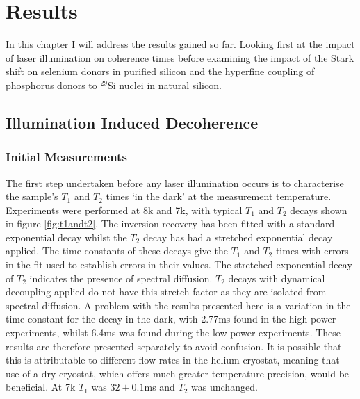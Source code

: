 \chapter{Results}

In this chapter I will address the results gained so far. Looking first at the impact of laser illumination on coherence times before examining the impact of the Stark shift on selenium donors in purified silicon and the hyperfine coupling of phosphorus donors to $^{29}$Si nuclei in natural silicon.

\section{Illumination Induced Decoherence}

\subsection{Initial Measurements}

The first step undertaken before any laser illumination occurs is to characterise the sample's $T_1$ and $T_2$ times `in the dark' at the measurement temperature. 
Experiments were performed at 8k and 7k, with typical $T_1$ and $T_2$ decays shown in figure \ref{fig:t1andt2}.
The inversion recovery has been fitted with a standard exponential decay whilst the $T_2$ decay has had a stretched exponential decay applied.
The time constants of these decays give the $T_1$ and $T_2$ times with errors in the fit used to establish errors in their values.
The stretched exponential decay of $T_2$ indicates the presence of spectral diffusion.
$T_2$ decays with dynamical decoupling applied do not have this stretch factor as they are isolated from spectral diffusion.
A problem with the results presented here is a variation in the time constant for the decay in the dark, with 2.77ms found in the high power experiments, whilst 6.4ms was found during the low power experiments. 
These results are therefore presented separately to avoid confusion.
It is possible that this is attributable to different flow rates in the helium cryostat, meaning that use of a dry cryostat, which offers much greater temperature precision, would be beneficial. 
At 7k $T_1$ was $32\pm0.1$ms and $T_2$ was unchanged.


